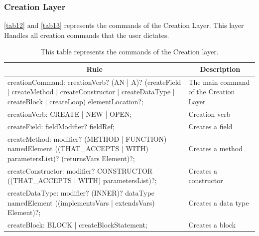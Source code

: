 \subsubsection{Creation Layer}
\autoref{tab12} and \autoref{tab13} represents the commands of the Creation Layer. This layer Handles all creation commands that the user dictates.
\begin{table}[H]
\centering
\begin{tabular}{|p{8cm}|p{7cm}|}
\hline
\multicolumn{1}{|c|}{{\bf Rule}} & \multicolumn{1}{c|}{{\bf Description}} \\ \hline
creationCommand: creationVerb? (AN | A)? (createField | createMethod | createConstructor | createDataType | createBlock | createLoop) elementLocation?; & The main command of the Creation Layer \\ \hline
creationVerb: CREATE | NEW | OPEN; & Creation verb                          \\ \hline
createField: fieldModifier? fieldRef; & Creates a field                        \\ \hline
createMethod: modifier? (METHOD | FUNCTION) namedElement ((THAT\_ACCEPTS | WITH) parametersList)? (returnsVars Element)?;                               & Creates a method                       \\ \hline
createConstructor: modifier? CONSTRUCTOR ((THAT\_ACCEPTS | WITH) parametersList)?;                                                                      & Creates a constructor                  \\ \hline
createDataType: modifier? (INNER)? dataType namedElement ((implementsVars | extendsVars) Element)?;                                                     & Creates a data type                    \\ \hline
createBlock: BLOCK | createBlockStatement;                                                                                                              & Creates a block                        \\ \hline
\end{tabular}
\caption{This table represents the commands of the Creation layer.}
\label{tab12}
\end{table}

